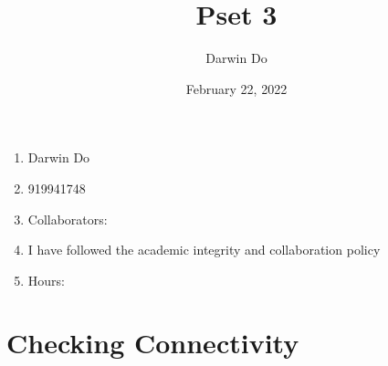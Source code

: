 \documentclass{article}
\title{Pset 3}
\begin{document}
\date{February 22, 2022 }
\author{Darwin Do}

\maketitle

\begin{enumerate}
    \item Darwin Do
    \item 919941748
    \item Collaborators: 
    \item I have followed the academic integrity and collaboration policy
    \item Hours: 
\end{enumerate}

\newpage

\section{Checking Connectivity}
\end{document}
